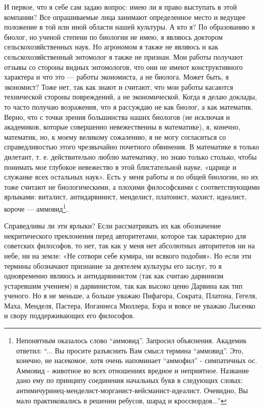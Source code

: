 И первое,  что я себе  сам задаю вопрос: имею  ли я право  выступать в
этой  компании? Все  опрашиваемые лица  занимают определенное  место и
ведущее положение в  той или иной области нашей культуры.  А кто я? По
образованию  я  биолог, но  ученой  степени  по  биологии не  имею,  я
являюсь доктором  сельскохозяйственных наук.  Но агрономом я  также не
являюсь и как  сельскохозяйственный энтомолог я также  не признан. Мои
работы  получают отзывы  со  стороны видных  энтомологов,  что они  не
имеют конструктивного  характера и  что это  --- работы  экономиста, а
не  биолога. Может  быть,  я  экономист? Тоже  нет,  так  как знают  и
считают, что мои работы касаются технической стороны повреждений, а не
экономической. Когда я делаю доклады, то часто получаю возражения, что
я  рассуждаю не  как  биолог,  а как  математик.  Верно,  что с  точки
зрения большинства  наших биологов (не исключая  и академиков, которые
совершенно невежественны  в математике), я, конечно,  математик, но, к
моему  великому сожалению,  я не  могу согласиться  со справедливостью
этого чрезвычайно почетного обвинения. В математике я только дилетант,
т. е.  действительно люблю математику,  но знаю только  столько, чтобы
понимать мое глубокое невежество в этой блистательной науке, «царице и
служанке  всех  остальных  наук».  Есть  у  меня  работы  и  по  общей
биологии, но их тоже считают не биологическими, а плохими философскими
с  соответствующими  ярлыками:   виталист,  антидарвинист,  менделист,
платонист,  махист, идеалист,  короче ---  аммовид\footnote{Непонятным
оказалось слово “аммовид”. Запросил объяснения. Академик ответил: “...
Вы  просите  разъяснить Вам  смысл  термина  “аммовид”. Это,  конечно,
не  насекомое,  хотя  очень  напоминает “аммофил”  -  симпатичных  ос.
Аммовид - животное  во всех отношениях вредное  и неприятное. Название
дано ему  по принципу  соединения начальных  букв в  следующих словах:
антимичуринец-менделист-морганист-вейсманист-идеалист.   Очевидно,  Вы
мало практиковались в решении ребусов, шарад и кроссвордов...”}.

Справедливы ли эти ярлыки? Если рассматривать их как обозначение
некритического преклонения перед авторитетами, которое так характерно
для советских философов, то нет, так как у меня нет абсолютных
авторитетов ни на небе, ни на земле: «Не сотвори себе кумира, ни
всякого подобия». Но если эти термины обозначают признание за деятелем
культуры его заслуг, то я одновременно являюсь и антидарвинистом (так
как считаю дарвинизм устаревшим учением) и дарвинистом, так как высоко
ценю Дарвина как тип ученого. Но я не меньше, а больше уважаю
Пифагора, Сократа, Платона, Гегеля, Маха, Менделя, Пастера, Иоганнеса
Мюллера, Бэра и вовсе не уважаю Лысенко и свору поддерживающих его
философов.

